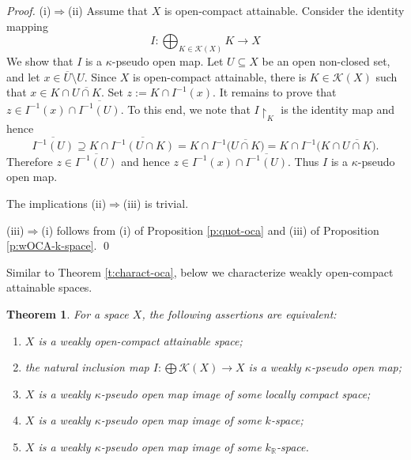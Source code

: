 \documentclass[preprint,11pt]{elsarticle}
\def\dag-{$\kappa$-pseudo open }
\newtheorem{theorem}{Theorem}[section]
\numberwithin{equation}{section}
\numberwithin{theorem}{section}
\newcommand{\IR}{\mathbb{R}}
\newcommand{\KK}{\mathcal{K}}
\newcommand{\Ra}{\Rightarrow}
\newcommand{\SM}{{\setminus}}
\begin{document}
\begin{proof}
(i)$\Ra$(ii) Assume that $X$ is open-compact  attainable. Consider the identity mapping
\[
I:\bigoplus_{K\in \KK(X)} K \to X
\]
We show that $I$ is a  $\kappa$-pseudo open map. Let $U\subseteq X$ be an open non-closed set, and let  $x\in \overline{U}\SM U$. Since $X$ is open-compact  attainable, there is $K\in\KK(X)$ such that $x\in K\cap \overline{U\cap K}$. Set $z:=K\cap I^{-1}(x)$. It remains to prove that $z\in I^{-1}(x)\cap \overline{I^{-1}(U)}$.
To this end, we note that $I{\restriction}_K$ is the identity map and hence
\[
\overline{I^{-1}(U)}\supseteq K\cap\overline{I^{-1}(U\cap K)}=K\cap I^{-1} \big( \overline{U\cap K}\big)=K\cap I^{-1} \big( K\cap\overline{U\cap K}\big).
\]
Therefore $z\in \overline{I^{-1}(U)}$ and hence $z\in I^{-1}(x)\cap \overline{I^{-1}(U)}$. Thus $I$ is  a \dag-map.
\smallskip

The implications (ii)$\Ra$(iii) is trivial. %
\smallskip

(iii)$\Ra$(i) follows from (i) of Proposition \ref{p:quot-oca} and (iii) of Proposition \ref{p:wOCA-k-space}. \qed %
\end{proof}





Similar to Theorem \ref{t:charact-oca}, below we characterize weakly open-compact  attainable spaces.
\begin{theorem} \label{t:character-woca}
For a space $X$, the following assertions are equivalent:
\begin{enumerate}
\item[{\rm(i)}] $X$ is a weakly open-compact  attainable space;
\item[{\rm(ii)}] the natural inclusion map $I: \bigoplus\KK(X)\to X$ is a weakly  $\kappa$-pseudo open map;
\item[{\rm(iii)}] $X$ is a weakly  $\kappa$-pseudo open map image of some locally compact space;
\item[{\rm(iv)}] $X$ is a  weakly  $\kappa$-pseudo open map image of some  $k$-space;
\item[{\rm(v)}] $X$ is a  weakly   $\kappa$-pseudo open map image of some $k_\IR$-space.
\end{enumerate}
\end{theorem}
\end{document}
